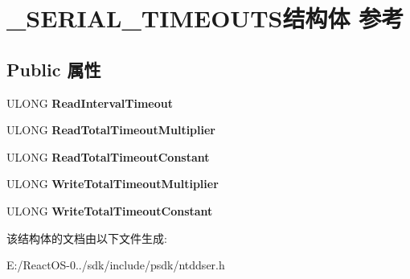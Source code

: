 \hypertarget{struct___s_e_r_i_a_l___t_i_m_e_o_u_t_s}{}\section{\+\_\+\+S\+E\+R\+I\+A\+L\+\_\+\+T\+I\+M\+E\+O\+U\+T\+S结构体 参考}
\label{struct___s_e_r_i_a_l___t_i_m_e_o_u_t_s}
\subsection*{Public 属性}
\begin{DoxyCompactItemize}
\item 
\mbox{\label{struct___s_e_r_i_a_l___t_i_m_e_o_u_t_s_a7bcd2138b63cbfb4fb29516277ab04d8}} 
U\+L\+O\+NG {\bfseries Read\+Interval\+Timeout}
\item 
\mbox{\label{struct___s_e_r_i_a_l___t_i_m_e_o_u_t_s_a6e1de82b33770517fd7b9dacaa068d31}} 
U\+L\+O\+NG {\bfseries Read\+Total\+Timeout\+Multiplier}
\item 
\mbox{\label{struct___s_e_r_i_a_l___t_i_m_e_o_u_t_s_a40c0374502449af71a568c55645a2a9e}} 
U\+L\+O\+NG {\bfseries Read\+Total\+Timeout\+Constant}
\item 
\mbox{\label{struct___s_e_r_i_a_l___t_i_m_e_o_u_t_s_a1db1a991eb62672b152023f8e9e2f967}} 
U\+L\+O\+NG {\bfseries Write\+Total\+Timeout\+Multiplier}
\item 
\mbox{\label{struct___s_e_r_i_a_l___t_i_m_e_o_u_t_s_a6af33dc171e1e87e334d7922491b4256}} 
U\+L\+O\+NG {\bfseries Write\+Total\+Timeout\+Constant}
\end{DoxyCompactItemize}


该结构体的文档由以下文件生成\+:\begin{DoxyCompactItemize}
\item 
E\+:/\+React\+O\+S-\/0../sdk/include/psdk/ntddser.\+h\end{DoxyCompactItemize}
